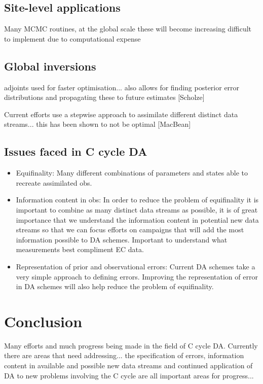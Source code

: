 \documentclass[12pt]{article}
\begin{document}
\subsection{Site-level applications}

Many MCMC routines, at the global scale these will become increasing difficult to implement due to computational expense

\subsection{Global inversions}

adjoints used for faster optimisation... also allows for finding posterior error distributions and propagating these to future estimates [Scholze]

Current efforts use a stepwise approach to assimilate different distinct data streams... this has been shown to not be optimal [MacBean]

\subsection{Issues faced in C cycle DA}

\begin{itemize}
\item Equifinality: Many different combinations of parameters and states able to recreate assimilated obs.

\item Information content in obs: In order to reduce the problem of equifinality it is important to combine as many distinct data streams as possible, it is of great importance that we understand the information content in potential new data streams so that we can focus efforts on campaigns that will add the most information possible to DA schemes. Important to understand what measurements best compliment EC data.

\item Representation of prior and observational errors: Current DA schemes take a very simple approach to defining errors. Improving the representation of error in DA schemes will also help reduce the problem of equifinality.  
\end{itemize}

\section{Conclusion} 

Many efforts and much progress being made in the field of C cycle DA. Currently there are areas that need addressing... the specification of errors, information content in available and possible new data streams and continued application of DA to new problems involving the C cycle are all important areas for progress...
\end{document}
